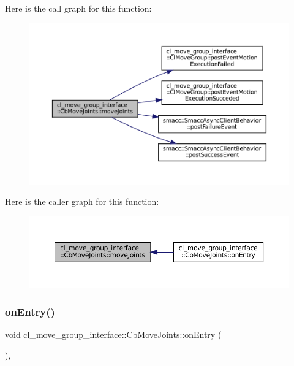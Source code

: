 Here is the call graph for this function\+:
\nopagebreak
\begin{figure}[H]
\begin{center}
\leavevmode
\includegraphics[width=350pt]{classcl__move__group__interface_1_1CbMoveJoints_ad91d243eb8a818e240d85e5a7fdea68d_cgraph}
\end{center}
\end{figure}
Here is the caller graph for this function\+:
\nopagebreak
\begin{figure}[H]
\begin{center}
\leavevmode
\includegraphics[width=350pt]{classcl__move__group__interface_1_1CbMoveJoints_ad91d243eb8a818e240d85e5a7fdea68d_icgraph}
\end{center}
\end{figure}
\mbox{\label{classcl__move__group__interface_1_1CbMoveJoints_a23e4181af695aed9fa6bb4ae3f17fd76}} 
\subsubsection{\texorpdfstring{on\+Entry()}{onEntry()}}
{\footnotesize\ttfamily void cl\+\_\+move\+\_\+group\+\_\+interface\+::\+Cb\+Move\+Joints\+::on\+Entry (\begin{DoxyParamCaption}{ }\end{DoxyParamCaption})\hspace{0.3cm}{\ttfamily [override]}, {\ttfamily [virtual]}}



